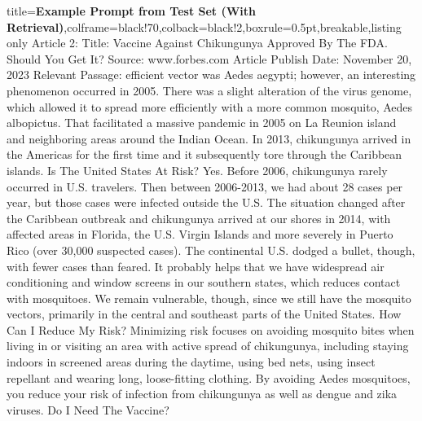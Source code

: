 \begin{tcblisting}{title={\textbf{Example Prompt from Test Set (With Retrieval)}},colframe=black!70,colback=black!2,boxrule=0.5pt,breakable,listing only}
Article 2:
Title: Vaccine Against Chikungunya Approved By The FDA. Should You Get It?
Source: www.forbes.com
Article Publish Date: November 20, 2023
Relevant Passage: efficient vector was Aedes aegypti; however, an interesting phenomenon occurred in 2005. There was a slight alteration of the virus genome, which allowed it to spread more efficiently with a more common mosquito, Aedes albopictus. That facilitated a massive pandemic in 2005 on La Reunion island and neighboring areas around the Indian Ocean. In 2013, chikungunya arrived in the Americas for the first time and it subsequently tore through the Caribbean islands. Is The United States At Risk? Yes. Before 2006, chikungunya rarely occurred in U.S. travelers. Then between 2006-2013, we had about 28 cases per year, but those cases were infected outside the U.S. The situation changed after the Caribbean outbreak and chikungunya arrived at our shores in 2014, with affected areas in Florida, the U.S. Virgin Islands and more severely in Puerto Rico (over 30,000 suspected cases). The continental U.S. dodged a bullet, though, with fewer cases than feared. It probably helps that we have widespread air conditioning and window screens in our southern states, which reduces contact with mosquitoes. We remain vulnerable, though, since we still have the mosquito vectors, primarily in the central and southeast parts of the United States. How Can I Reduce My Risk? Minimizing risk focuses on avoiding mosquito bites when living in or visiting an area with active spread of chikungunya, including staying indoors in screened areas during the daytime, using bed nets, using insect repellant and wearing long, loose-fitting clothing. By avoiding Aedes mosquitoes, you reduce your risk of infection from chikungunya as well as dengue and zika viruses. Do I Need The Vaccine?


\end{tcblisting}
